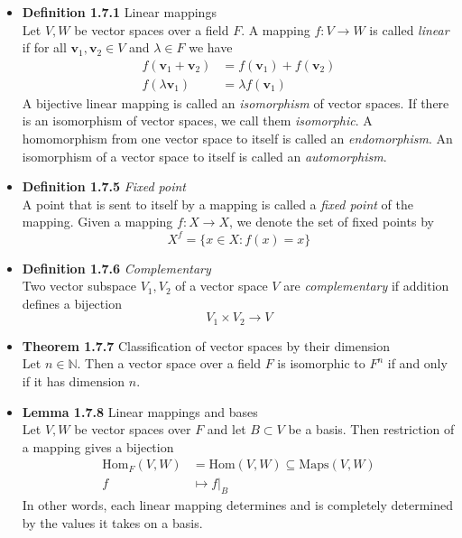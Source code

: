\documentclass[11pt,a4paper]{article}
\begin{document}
\begin{itemize}

    \item \textbf{Definition 1.7.1} Linear mappings \\
        Let $V,W$ be vector spaces over a field $F$.
        A mapping $f: V \to W$ is called \emph{linear}
        if for all $\textbf{v}_1, \textbf{v}_2 \in V$ and $\lambda \in F$ we have
        \begin{align*}{}
            f(\textbf{v}_1 + \textbf{v}_2) & = f(\textbf{v}_1) + f(\textbf{v}_2) \\
            f(\lambda\textbf{v}_1)         & = \lambda f(\textbf{v}_1)
        \end{align*}
        A bijective linear mapping is called an \emph{isomorphism} of vector spaces.
        If there is an isomorphism of vector spaces, we call them \emph{isomorphic}.
        A homomorphism from one vector space to itself is called an \emph{endomorphism}.
        An isomorphism of a vector space to itself is called an \emph{automorphism}.

    \item \textbf{Definition 1.7.5} \emph{Fixed point} \\
        A point that is sent to itself by a mapping is called a \emph{fixed point} of the mapping.
        Given a mapping $f: X \to X$, we denote the set of fixed points by
        \[
            X^f = \{x \in X : f(x) = x\}
        \]

    \item \textbf{Definition 1.7.6} \emph{Complementary} \\
        Two vector subspace $V_1, V_2$ of a vector space $V$ are \emph{complementary} if addition
        defines a bijection
        \[
            V_1 \times V_2 \to V
        \]

    \item \textbf{Theorem 1.7.7} Classification of vector spaces by their dimension \\
        Let $n \in \mathbb{N}$.
        Then a vector space over a field $F$ is isomorphic to $F^n$ if and only if it has
        dimension $n$.

    \item \textbf{Lemma 1.7.8} Linear mappings and bases \\
        Let $V,W$ be vector spaces over $F$ and let $B \subset V$ be a basis.
        Then restriction of a mapping gives a bijection
        \begin{align*}{}
            \text{Hom}_F(V,W) & = \text{Hom}(V,W) \subseteq \text{Maps}(V,W) \\
            f                 & \mapsto f|_B
        \end{align*}
        In other words, each linear mapping determines and is completely determined by the values
        it takes on a basis.


\end{itemize}
\end{document}
